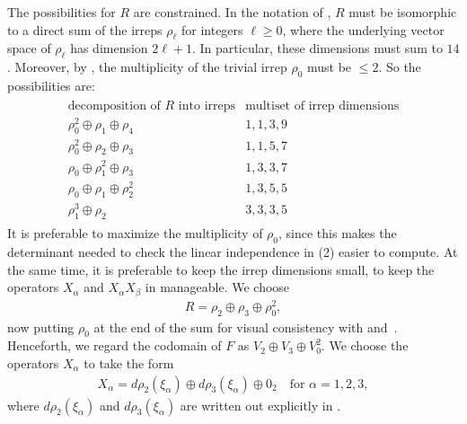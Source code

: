 \documentclass[a4paper,10pt,leqno]{article}
\numberwithin{equation}{section}
\theoremstyle{plain}
\theoremstyle{definition}
\theoremstyle{remark}
\begin{document}
The possibilities for $R$ are constrained.
In the notation of , $R$ must be isomorphic to a direct sum of the irreps $\rho_\ell$ for integers $\ell \geq 0$, where the underlying vector space of $\rho_\ell$ has dimension $2\ell + 1$.
In particular, these dimensions must sum to $14$.
Moreover, by , the multiplicity of the trivial irrep $\rho_0$ must be $\leq 2$.
So the possibilities are:
\begin{align} 
\begin{array}{ll}
\text{decomposition of $R$ into irreps}
	&\text{multiset of irrep dimensions}\\
	\hline 
\rho_0^2 \oplus \rho_1 \oplus \rho_4 
	&1,1,3,9\\
\rho_0^2 \oplus \rho_2 \oplus \rho_3 
	&1,1,5,7\\
\rho_0 \oplus \rho_1^2 \oplus \rho_3
	&1,3,3,7\\
\rho_0 \oplus \rho_1 \oplus \rho_2^2
	&1,3,5,5\\
\rho_1^3 \oplus \rho_2
	&3,3,3,5
\end{array}
\end{align}
It is preferable to maximize the multiplicity of $\rho_0$, since this makes the determinant needed to check the linear independence in (2) easier to compute.
At the same time, it is preferable to keep the irrep dimensions small, to keep the operators $X_\alpha$ and $X_\alpha X_\beta$ in  manageable.
We choose
\begin{align}\label{eq:5-7}
R = \rho_2 \oplus \rho_3 \oplus \rho_0^2,
\end{align} 
now putting $\rho_0$ at the end of the sum for visual consistency with  and~\cite{deleo}.
Henceforth, we regard the codomain of $F$ as $V_2 \oplus V_3 \oplus V_0^2$.
We choose the operators $X_\alpha$ to take the form
\begin{align} 
X_\alpha = d\rho_2(\xi_\alpha) \oplus d\rho_3(\xi_\alpha) \oplus 0_2
\quad\text{for $\alpha = 1,2,3$},
\end{align} 
where $d\rho_2(\xi_\alpha)$ and $d\rho_3(\xi_\alpha)$ are written out explicitly in .
\end{document}
